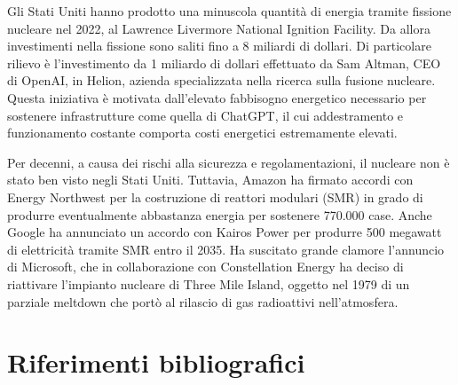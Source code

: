 \documentclass[12pt,a4paper,oneside]{book}
\begin{document}
Gli Stati Uniti hanno prodotto una minuscola quantità di energia tramite fissione nucleare nel 2022, al Lawrence Livermore National Ignition Facility. Da allora investimenti nella fissione sono saliti fino a 8 miliardi di dollari. Di particolare rilievo è l'investimento da 1 miliardo di dollari effettuato da Sam Altman, CEO di OpenAI, in Helion, azienda specializzata nella ricerca sulla fusione nucleare. Questa iniziativa è motivata dall'elevato fabbisogno energetico necessario per sostenere infrastrutture come quella di ChatGPT, il cui addestramento e funzionamento costante comporta costi energetici estremamente elevati.

Per decenni, a causa dei rischi alla sicurezza e regolamentazioni, il nucleare non è stato ben visto negli Stati Uniti. Tuttavia, Amazon ha firmato accordi con Energy Northwest per la costruzione di reattori modulari (SMR) in grado di produrre eventualmente abbastanza energia per sostenere 770.000 case. Anche Google ha annunciato un accordo con Kairos Power per produrre 500 megawatt di elettricità tramite SMR entro il 2035.
Ha suscitato grande clamore l'annuncio di Microsoft, che in collaborazione con Constellation Energy ha deciso di riattivare l'impianto nucleare di Three Mile Island, oggetto nel 1979 di un parziale meltdown che portò al rilascio di gas radioattivi nell'atmosfera.


\renewcommand{\bibsection}{}
\chapter*{Riferimenti bibliografici}

\newpage
\end{document}
